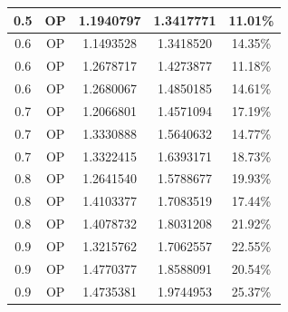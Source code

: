 \documentclass[12pt,a4paper,italian]{article}
\begin{document}
\begin{table}[ht!]
\begin{minipage}[b]{0.48\linewidth}
\begin{tabular}{c c c c c}
 0.5 & OP & 1.1940797 &   1.3417771    & 11.01\% \\ \hline \hline
 0.6 & OP & 1.1493528 &   1.3418520    & 14.35\% \\
 0.6 & OP & 1.2678717 &   1.4273877    & 11.18\% \\
 0.6 & OP & 1.2680067 &   1.4850185    & 14.61\% \\ \hline \hline
 0.7 & OP & 1.2066801 &   1.4571094    & 17.19\% \\
 0.7 & OP & 1.3330888 &   1.5640632    & 14.77\% \\
 0.7 & OP & 1.3322415 &   1.6393171    & 18.73\% \\ \hline \hline
 0.8 & OP & 1.2641540 &   1.5788677    & 19.93\% \\
 0.8 & OP & 1.4103377 &   1.7083519    & 17.44\% \\
 0.8 & OP & 1.4078732 &   1.8031208    & 21.92\% \\ \hline \hline
 0.9 & OP & 1.3215762 &   1.7062557    & 22.55\% \\
 0.9 & OP & 1.4770377 &   1.8588091    & 20.54\% \\
 0.9 & OP & 1.4735381 &   1.9744953    & 25.37\% \\\hline
			

\end{tabular}
\end{minipage}
\end{table}
\end{document}
